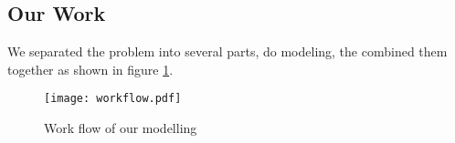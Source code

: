 \subsection{Our Work}

We separated the problem into several parts, do modeling, the combined them together as shown in figure \ref{fig:workflow}.

\begin{figure}[ht]\caption{Work flow of our modelling}\label{fig:workflow}
    \begin{center}
        \texttt{[image: workflow.pdf]}
    \end{center}\end{figure}
